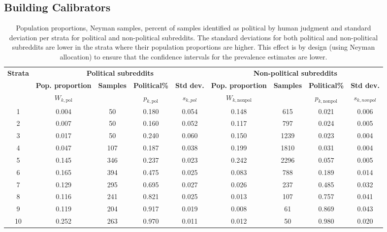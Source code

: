 \documentclass[letterpaper]{article} %
\begin{document}
\subsection{Building Calibrators}\label{building_calibrators}



\begin{table}[t]
\label{eval}
  \centering
  \begin{tabular}{|c|c|c|c|c|c|c|c|c|}
    \hline
    \multirow{3}{*}{\textbf{Strata}} & \multicolumn{4}{c|}{\textbf{Political subreddits}} &
    \multicolumn{4}{c|}{\textbf{Non-political subreddits}}\\
        \cline{2-9}
    & \textbf{Pop. proportion} & \textbf{Samples} & \textbf{Political\%} & \textbf{Std dev.} &\textbf{Pop. proportion} & \textbf{Samples} &\textbf{Political\%}& \textbf{Std dev.}\\
   & $W_{k,\textrm{pol}}$&   & $p_{k,\textrm{pol}}$ & $s_{k,pol}$ &$W_{k,\textrm{nonpol}}$ &  & $p_{k,\textrm{nonpol}}$& $s_{k,nonpol}$\\
    \hline
 1 & 0.004 & 50 & 0.180 & 0.054 & 0.148 & 615 &   0.021 &  0.006\\
 2 & 0.007 & 50 & 0.160 & 0.052 & 0.117  & 797   & 0.024 &  0.005\\
 3 & 0.017 & 50 & 0.240 & 0.060 & 0.150 & 1239 &  0.023 &  0.004\\
 4 & 0.047 & 107 & 0.187 & 0.038 & 0.199 & 1810 &  0.031 &  0.004\\
 5 & 0.145 & 346 & 0.237 & 0.023 & 0.242 & 2296 & 0.057 &  0.005\\
 6 & 0.165 & 394 & 0.475 & 0.025 & 0.083  & 788   & 0.189 &  0.014\\
 7 & 0.129 & 295 & 0.695 & 0.027 & 0.026  & 237 & 0.485 &  0.032\\
 8 & 0.116 & 241 & 0.821 & 0.025 & 0.013  & 107 & 0.757 &  0.041\\
 9 & 0.119 & 204 & 0.917 & 0.019 & 0.008  & 61 & 0.869 &  0.043\\
 10 & 0.252 & 263 & 0.970 & 0.011 & 0.012  & 50 & 0.980 &  0.020\\
    \hline
  \end{tabular}
  \caption{Population proportions, Neyman samples, percent of samples identified as political by human judgment and standard deviation per strata for political and non-political subreddits. The standard deviations for both political and non-political subreddits are lower in the strata where their population proportions are higher. This effect is by design (using Neyman allocation) to ensure that the confidence intervals for the prevalence estimates are lower. }\label{tab:sampling_estimation}
\end{table}
\end{document}
